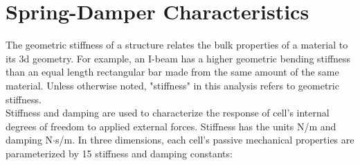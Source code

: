 {\section{Spring-Damper Characteristics}

The geometric stiffness of a structure relates the bulk properties of a material to its 3d geometry.  For example, an I-beam has a higher geometric bending stiffness than an equal length rectangular bar made from the same amount of the same material.  Unless otherwise noted, "stiffness" in this analysis refers to geometric stiffness.\\

Stiffness and damping are used to characterize the response of cell's internal degrees of freedom to applied external forces.  Stiffness has the units N/m and damping N$\cdot$s/m.  In three dimensions, each cell's passive mechanical properties are parameterized by 15 stiffness and damping constants:

}

